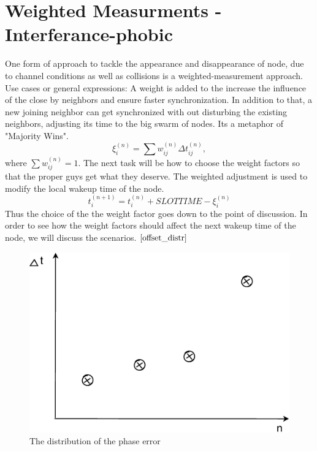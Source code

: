 \documentclass[a4paper,8pt]{report}
\begin{document}
\section{Weighted Measurments - Interferance-phobic}
One form of approach to tackle the appearance and disappearance of node, due to channel
conditions as well as collisions is a weighted-measurement approach.
Use cases or general expressions: A weight is added to the increase
the influence of the close by neighbors and ensure faster
synchronization. In addition to that, a new joining neighbor can get
synchronized with out disturbing the existing neighbors, adjusting
its time to the big swarm of nodes. Its a metaphor of "Majority
Wins".
\begin{equation}
\xi_i^{(n)} = \sum{w_{ij}^{(n)}\Delta t_{ij}^{(n)}} ,
\end{equation}
where $\sum{w_{ij}^{(n)}= 1}$. The next task will be how to choose
the weight factors so that the proper guys get what they deserve.
\newline
The weighted adjustment is used to modify the local wakeup time of
the node.
\begin{equation}
t_i^{(n+1)} = t_i^{(n)} + SLOTTIME - \xi_i^{(n)}
\end{equation}
\newline Thus the choice of the the weight factor goes down to the point of discussion. In order to
see how the weight factors should affect the next wakeup time of the
node, we will discuss the scenarios. $\ref{offset_distr}$
\begin{figure} \centering
\includegraphics[width= 1\textwidth]{offset_distr}
\caption{The distribution of the phase error} \label{offset_distr}
\end{figure}
\end{document}
